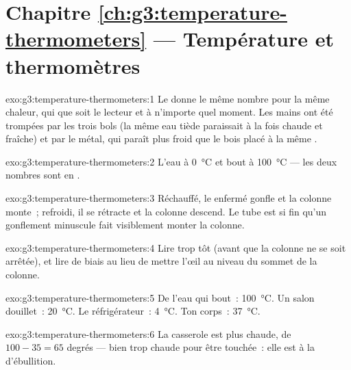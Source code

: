 \section*{Chapitre \ref{ch:g3:temperature-thermometers} --- Température et thermomètres}

\begin{solution}{exo:g3:temperature-thermometers:1}
Le  donne le même nombre pour la même chaleur, qui que
soit le lecteur et à n'importe quel moment. Les mains ont été
trompées par les trois bols (la même eau tiède paraissait à la fois
chaude et fraîche) et par le métal, qui paraît plus froid que le bois
placé à la même .
\end{solution}

\begin{solution}{exo:g3:temperature-thermometers:2}
L'eau  à \qty{0}{\celsius} et bout à \qty{100}{\celsius} --- les
deux nombres sont en .
\end{solution}

\begin{solution}{exo:g3:temperature-thermometers:3}
Réchauffé, le  enfermé gonfle et la colonne monte~; refroidi,
il se rétracte et la colonne descend. Le tube est si fin qu'un
gonflement minuscule fait visiblement monter la colonne.
\end{solution}

\begin{solution}{exo:g3:temperature-thermometers:4}
Lire trop tôt (avant que la colonne ne se soit arrêtée), et lire de
biais au lieu de mettre l'œil au niveau du sommet de la colonne.
\end{solution}

\begin{solution}{exo:g3:temperature-thermometers:5}
De l'eau qui bout~: \qty{100}{\celsius}. Un salon douillet~:
\qty{20}{\celsius}. Le réfrigérateur~: \qty{4}{\celsius}. Ton corps~:
\qty{37}{\celsius}.
\end{solution}

\begin{solution}{exo:g3:temperature-thermometers:6}
La casserole est plus chaude, de $100 - 35 = 65$ degrés --- bien trop
chaude pour être touchée~: elle est à la  d'ébullition.
\end{solution}

